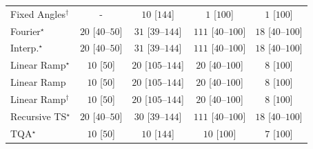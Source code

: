\begin{tabular}{l|cccc|}
Fixed Angles$^\dagger$ & {\cellcolor[HTML]{000000}} \color[HTML]{F1F1F1} {\cellcolor{white}} \color{black} - & {\cellcolor[HTML]{F6FCF4}} \color[HTML]{000000} $10$ [$144$] & {\cellcolor[HTML]{F7FCF5}} \color[HTML]{000000} $1$ [$100$] & {\cellcolor[HTML]{F7FCF5}} \color[HTML]{000000} $1$ [$100$] \\
Fourier$^\star$ & {\cellcolor[HTML]{F4FBF1}} \color[HTML]{000000} $20$ [$40$--$50$] & {\cellcolor[HTML]{F2FAEF}} \color[HTML]{000000} $31$ [$39$--$144$] & {\cellcolor[HTML]{E1F3DC}} \color[HTML]{000000} $111$ [$40$--$100$] & {\cellcolor[HTML]{F4FBF2}} \color[HTML]{000000} $18$ [$40$--$100$] \\
Interp.$^\star$ & {\cellcolor[HTML]{F4FBF1}} \color[HTML]{000000} $20$ [$40$--$50$] & {\cellcolor[HTML]{F2FAEF}} \color[HTML]{000000} $31$ [$39$--$144$] & {\cellcolor[HTML]{E1F3DC}} \color[HTML]{000000} $111$ [$40$--$100$] & {\cellcolor[HTML]{F4FBF2}} \color[HTML]{000000} $18$ [$40$--$100$] \\
Linear Ramp$^\star$ & {\cellcolor[HTML]{F6FCF4}} \color[HTML]{000000} $10$ [$50$] & {\cellcolor[HTML]{F4FBF1}} \color[HTML]{000000} $20$ [$105$--$144$] & {\cellcolor[HTML]{F4FBF1}} \color[HTML]{000000} $20$ [$40$--$100$] & {\cellcolor[HTML]{F6FCF4}} \color[HTML]{000000} $8$ [$100$] \\
Linear Ramp & {\cellcolor[HTML]{F6FCF4}} \color[HTML]{000000} $10$ [$50$] & {\cellcolor[HTML]{F4FBF1}} \color[HTML]{000000} $20$ [$105$--$144$] & {\cellcolor[HTML]{F4FBF1}} \color[HTML]{000000} $20$ [$40$--$100$] & {\cellcolor[HTML]{F6FCF4}} \color[HTML]{000000} $8$ [$100$] \\
Linear Ramp$^\dagger$ & {\cellcolor[HTML]{F6FCF4}} \color[HTML]{000000} $10$ [$50$] & {\cellcolor[HTML]{F4FBF1}} \color[HTML]{000000} $20$ [$105$--$144$] & {\cellcolor[HTML]{F4FBF1}} \color[HTML]{000000} $20$ [$40$--$100$] & {\cellcolor[HTML]{F6FCF4}} \color[HTML]{000000} $8$ [$100$] \\
Recursive TS$^\star$ & {\cellcolor[HTML]{F4FBF1}} \color[HTML]{000000} $20$ [$40$--$50$] & {\cellcolor[HTML]{F2FAEF}} \color[HTML]{000000} $30$ [$39$--$144$] & {\cellcolor[HTML]{E1F3DC}} \color[HTML]{000000} $111$ [$40$--$100$] & {\cellcolor[HTML]{F4FBF2}} \color[HTML]{000000} $18$ [$40$--$100$] \\
TQA$^\star$ & {\cellcolor[HTML]{F6FCF4}} \color[HTML]{000000} $10$ [$50$] & {\cellcolor[HTML]{F6FCF4}} \color[HTML]{000000} $10$ [$144$] & {\cellcolor[HTML]{F6FCF4}} \color[HTML]{000000} $10$ [$100$] & {\cellcolor[HTML]{F6FCF4}} \color[HTML]{000000} $7$ [$100$] \\

\end{tabular}
